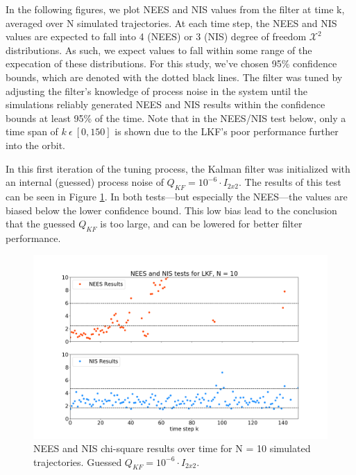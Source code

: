 \documentclass[11pt, a4paper]{article}
\begin{document}
In the following figures, we plot NEES and NIS values from the filter at time k, averaged over N simulated trajectories. 
At each time step, the NEES and NIS values are expected to fall into 4 (NEES) or 3 (NIS) degree of freedom $\mathcal{X}^2$ distributions. 
As such, we expect values to fall within some range of the expecation of these distributions. 
For this study, we've chosen 95\% confidence bounds, which are denoted with the dotted black lines. 
The filter was tuned by adjusting the filter's knowledge of process noise in the system until the simulations reliably generated NEES and NIS results within the confidence bounds at least 95\% of the time. 
Note that in the NEES/NIS test below, only a time span of $k\ \epsilon\ [0, 150]$ is shown due to the LKF's poor performance further into the orbit. 

In this first iteration of the tuning process, the Kalman filter was initialized with an internal (guessed) process noise of $Q_{KF} = 10^{-6} \cdot I_{2 x 2}$. 
The results of this test can be seen in Figure \ref{fig:neesnis_lkf_Qbig}. 
In both tests---but especially the NEES---the values are biased below the lower confidence bound. 
This low bias lead to the conclusion that the guessed $Q_{KF}$ is too large, and can be lowered for better filter performance. 
\begin{figure}[H]
	\centering
	\includegraphics[width=\textwidth]{Figures/NEESNIS_lkf_N10Q1.0E-06.png}
	\caption{NEES and NIS chi-square results over time for N = 10 simulated trajectories. Guessed $Q_{KF} = 10^{-6} \cdot I_{2 x 2}$.}
	\label{fig:neesnis_lkf_Qbig}
\end{figure}
\end{document}
